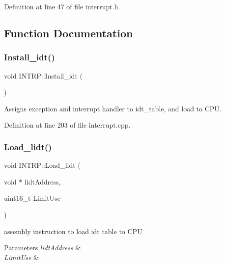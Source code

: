 Definition at line 47 of file interrupt.\+h.



\subsection{Function Documentation}
\mbox{\label{namespace_i_n_t_r_p_a139b273cc1e45d3c2fdfe0d387a98518}} 
\subsubsection{\texorpdfstring{Install\+\_\+idt()}{Install\_idt()}}
{\footnotesize\ttfamily void I\+N\+T\+R\+P\+::\+Install\+\_\+idt (\begin{DoxyParamCaption}{ }\end{DoxyParamCaption})}



Assigns exception and interrupt handler to idt\+\_\+table, and load to C\+PU. 



Definition at line 203 of file interrupt.\+cpp.

\mbox{\label{namespace_i_n_t_r_p_a194f85d6c873615e9125466e3b23c30f}} 
\subsubsection{\texorpdfstring{Load\+\_\+lidt()}{Load\_lidt()}}
{\footnotesize\ttfamily void I\+N\+T\+R\+P\+::\+Load\+\_\+lidt (\begin{DoxyParamCaption}\item[{void $\ast$}]{lidt\+Address,  }\item[{uint16\+\_\+t}]{Limit\+Use }\end{DoxyParamCaption})\hspace{0.3cm}{\ttfamily [inline]}}



assembly instruction to load idt table to C\+PU 


\begin{DoxyParams}{Parameters}
{\em lidt\+Address} & \\
\hline
{\em Limit\+Use} & \\
\hline
\end{DoxyParams}



